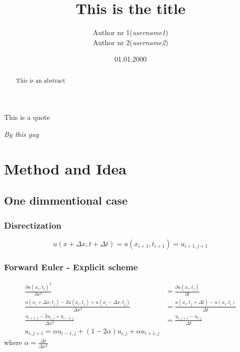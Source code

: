 \documentclass[10pt,a4paper]{article}
\begin{document}
\title{This is the title}
\author{
	\begin{tabular}{rl}
		Author nr 1 & (\textit{username1})\\
		Author nr 2 & (\textit{username2})\\
	\end{tabular}}
\date{01.01.2000}
\maketitle



\setlength{\epigraphwidth}{0.75\textwidth}
\renewcommand{\epigraphflush}{center}
\renewcommand{\beforeepigraphskip}{50pt}
\renewcommand{\afterepigraphskip}{100pt}
\renewcommand{\epigraphsize}{\normalsize}
\epigraph{This is a quote}
	{\textit{By this guy}}

\begin{abstract}
\noindent
This is an abstract
\end{abstract}

\pagebreak





\section{Method and Idea}
\subsection{One dimmentional case}
\subsubsection{Disrectization}
\begin{equation}
u(x+\Delta x, t+\Delta t) = u(x_{i+1},t_{i+1}) = u_{i+1,j+1}
\end{equation}

\subsubsection{Forward Euler - Explicit scheme}
\begin{align}
\frac{\partial u(x_i,t_j)^2}{\partial x^2} &= \frac{\partial u(x_i,t_j)}{\partial t} \\
\frac{u(x_i + \Delta x, t_j) - 2u(x_i,t_j) + u(x_i - \Delta x, t_j)}{\Delta x^2}
&= \frac{u(x_i, t_j + \Delta t) - u(x_i, t_i)}{\Delta t} \\
\frac{u_{i+1,j} - 2u_{i,j}+u_{i-1,j}}{\Delta x^2} &= \frac{u_{i,j+1} - u_{i,j}}{\Delta t} \\
u_{i,j+1} = \alpha u_{i-1,j} + (1-2\alpha)u_{i,j} + \alpha u_{i+1,j}
\end{align}
where $\alpha = \frac{\Delta t}{\Delta x^2}$
\end{document}
